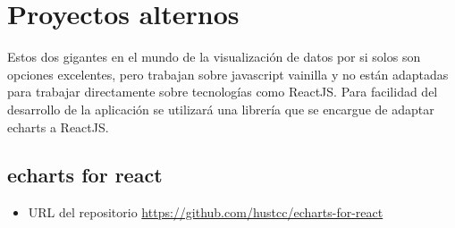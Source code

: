 \section{ Proyectos alternos }
Estos dos gigantes en el mundo de la visualización de datos por si solos son opciones excelentes, pero trabajan sobre javascript vainilla y no están adaptadas para trabajar directamente sobre tecnologías como ReactJS. 
Para facilidad del desarrollo de la aplicación se utilizará una librería que se encargue de adaptar echarts a ReactJS.

\subsection{ echarts for react }
\begin{itemize}
    \item URL del repositorio \href{https://github.com/hustcc/echarts-for-react}{https://github.com/hustcc/echarts-for-react}
\end{itemize}
